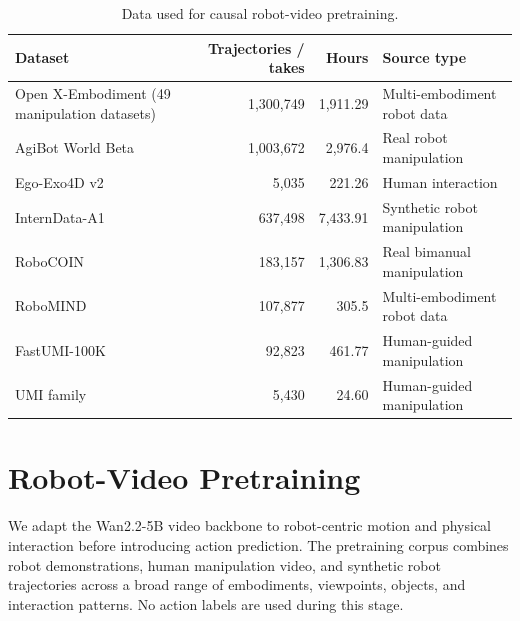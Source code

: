 \begin{table}[t]
    \centering
    \caption{
    Data used for causal robot-video pretraining. 
    }
    \label{tab:pretraining-corpus}
    \small
    \begin{tabular}{@{}lrrl@{}}
        \toprule
        \textbf{Dataset}
        & \textbf{Trajectories / takes}
        & \textbf{Hours}
        & \textbf{Source type} \\
        \midrule

        Open X-Embodiment (49 manipulation datasets)
        & 1,300,749
        & 1,911.29
        & Multi-embodiment robot data \\

        AgiBot World Beta
        & 1,003,672
        & 2,976.4
        & Real robot manipulation \\

        Ego-Exo4D v2
        & 5,035
        & 221.26
        & Human interaction \\

        InternData-A1
        & 637,498
        & 7,433.91
        & Synthetic robot manipulation \\

        RoboCOIN
        & 183,157
        & 1,306.83
        & Real bimanual manipulation \\

        RoboMIND
        & 107,877
        & 305.5
        & Multi-embodiment robot data \\

        FastUMI-100K
        & 92,823
        & 461.77
        & Human-guided manipulation \\

        UMI family
        & 5,430
        & 24.60
        & Human-guided manipulation \\

        \bottomrule
    \end{tabular}
\end{table}

\section{Robot-Video Pretraining}
\label{app:video-pretraining}

We adapt the Wan2.2-5B video backbone to robot-centric motion and physical
interaction before introducing action prediction. The pretraining corpus
combines robot demonstrations, human manipulation video, and synthetic robot
trajectories across a broad range of embodiments, viewpoints, objects, and
interaction patterns. No action labels are used during this stage.

